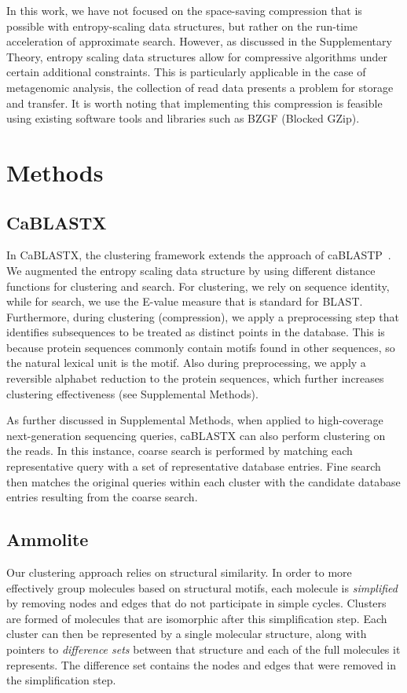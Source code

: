\documentclass[review,preprint,12pt]{elsarticle}
\renewcommand{\cite}{\citep} %
\theoremstyle{definition}
\theoremstyle{remark}
\numberwithin{equation}{section}
\begin{document}
In this work, we have not focused on the space-saving compression that is
possible with entropy-scaling data structures, but rather on the run-time
acceleration of approximate search.
However, as discussed in the Supplementary Theory, entropy scaling data structures
allow for compressive algorithms under certain additional constraints.
This is particularly applicable in the case of metagenomic analysis, the collection of 
read data presents a problem for storage and transfer.
It is worth noting that implementing this compression is feasible using existing software tools and libraries such as BZGF (Blocked GZip).

\section{Methods}
\subsection{CaBLASTX}

In CaBLASTX, the clustering framework extends the approach of caBLASTP~\cite{daniels2013compressive}.
We augmented the entropy scaling data structure by using
different distance functions for clustering and search.
For clustering, we rely on sequence identity, while for search, we use the
E-value measure that is standard for BLAST.
Furthermore, during clustering (compression), we apply a preprocessing step that
identifies subsequences to be treated as distinct points in the database.
This is because protein sequences commonly contain motifs found in other sequences,
so the natural lexical unit is the motif.
Also during preprocessing, we apply a reversible alphabet reduction to the
protein sequences, which further increases clustering effectiveness (see Supplemental Methods).

As further discussed in Supplemental Methods, when applied to high-coverage next-generation sequencing queries, caBLASTX can also perform clustering on the reads.
In this instance, coarse search is performed by matching each representative query with a set of representative database entries.
Fine search then matches the original queries within each cluster with the candidate database entries resulting from the coarse search.

\subsection{Ammolite}
Our clustering approach relies on structural similarity.
In order to more effectively group molecules based on structural motifs,
each molecule is \emph{simplified} by removing nodes and edges that do not
participate in simple cycles.
Clusters are formed of molecules that are isomorphic after this simplification
step.
Each cluster can then be represented by a single molecular structure, along 
with pointers to \emph{difference sets} between that structure and each of the 
full molecules it represents.
The difference set contains the nodes and edges that were removed in the 
simplification step.
\end{document}
